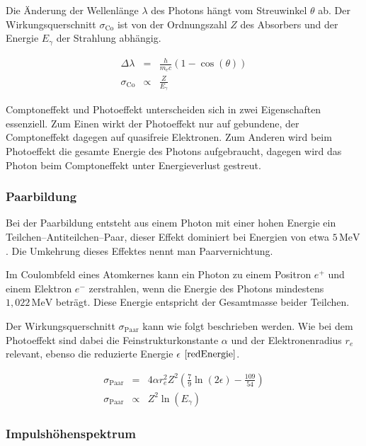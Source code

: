 \documentclass[12pt,a4paper]{scrartcl}
\numberwithin{equation}{section} %
\newcommand{\pu}[1]{\ensuremath{\mathrm{#1}}}
\begin{document}
Die Änderung der Wellenlänge $\lambda$ des Photons hängt vom Streuwinkel $\theta$ ab. Der Wirkungsquerschnitt $\sigma_\mathrm{Co}$ ist von der Ordnungszahl $Z$ des Absorbers und der Energie $E_\gamma$ der Strahlung abhängig. \cite{Bethge}

\begin{eqnarray}
    \Delta \lambda &=& \frac{h}{m_e c} (1 - \cos(\theta)) \\
    \sigma_\mathrm{Co} &\propto & \frac{Z}{E_\gamma}
\end{eqnarray}

\noindent
Comptoneffekt und Photoeffekt unterscheiden sich in zwei Eigenschaften essenziell. Zum Einen wirkt der Photoeffekt nur auf gebundene, der Comptoneffekt dagegen auf quasifreie Elektronen. Zum Anderen wird beim Photoeffekt die gesamte Energie des Photons aufgebraucht, dagegen wird das Photon beim Comptoneffekt unter Energieverlust gestreut.

\hypertarget{paarbildung}{%
\subsubsection{Paarbildung}\label{paarbildung}}

Bei der Paarbildung entsteht aus einem Photon mit einer hohen Energie ein Teilchen--Antiteilchen--Paar, dieser Effekt dominiert bei Energien von etwa $\pu{5\, MeV}$. Die Umkehrung dieses Effektes nennt man Paarvernichtung.

Im Coulombfeld eines Atomkernes kann ein Photon zu einem Positron $e^+$ und einem Elektron $e^-$ zerstrahlen, wenn die Energie des Photons mindestens $\pu{1,022\, MeV}$ beträgt. Diese Energie entspricht der Gesamtmasse beider Teilchen.

Der Wirkungsquerschnitt $\sigma_\mathrm{Paar}$ kann wie folgt beschrieben werden. Wie bei dem Photoeffekt sind dabei die Feinstrukturkonstante $\alpha$ und der Elektronenradius $r_e$ relevant, ebenso die reduzierte Energie $\epsilon$ $\eqref{redEnergie}$.

\begin{eqnarray}
    \sigma_\mathrm{Paar}
        &=& 4\alpha r_e^2 Z^2
            \left(\frac{7}{9} \ln(2\epsilon) - \frac{109}{54} \right) \\
    \sigma_\mathrm{Paar}
        &\propto& Z^2 \ln(E_\gamma)
\end{eqnarray}

\hypertarget{impulshuxf6henspektrum}{%
\subsubsection{Impulshöhenspektrum}\label{impulshuxf6henspektrum}}
\end{document}
